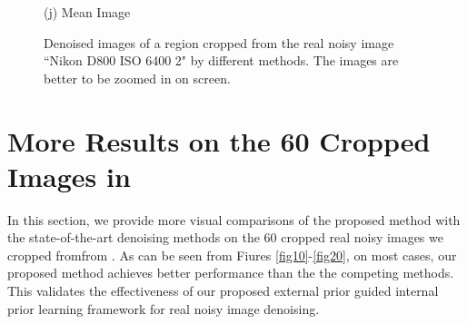 \documentclass[10pt,onecolumn,letterpaper]{article}
\begin{document}
\begin{figure}[H]
{\begin{minipage}[t]{0.195\textwidth}
{\footnotesize (j) Mean Image \cite{crosschannel2016}}
\end{minipage}
}
\caption{Denoised images of a region cropped from the real noisy image ``Nikon D800 ISO 6400 2" \cite{crosschannel2016} by different methods. The images are better to be zoomed in on screen.}
\label{fig9}
\end{figure}

\section{More Results on the 60 Cropped Images in \cite{crosschannel2016}}
In this section, we provide more visual comparisons of the proposed method with the state-of-the-art denoising methods on the 60 cropped real noisy images we cropped fromfrom \cite{crosschannel2016}. As can be seen from Fiures \ref{fig10}-\ref{fig20}, on most cases, our proposed method achieves better performance than the the competing methods. This validates the effectiveness of our proposed external prior guided internal prior learning framework for real noisy image denoising.
\end{document}
